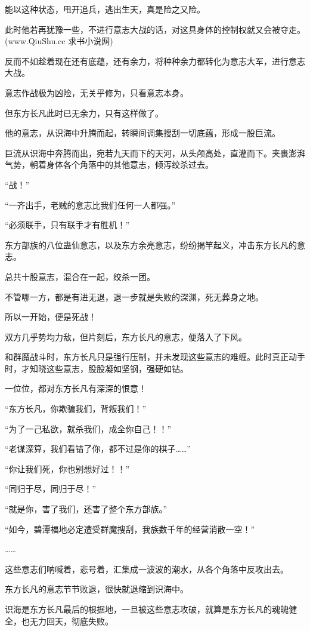 \begin{this_body}
能以这种状态，甩开追兵，逃出生天，真是险之又险。

此时他若再犹豫一些，不进行意志大战的话，对这具身体的控制权就又会被夺走。(www.QiuShu.cc 求书小说网)

反而不如趁着现在还有底蕴，还有余力，将种种余力都转化为意志大军，进行意志大战。

意志作战极为凶险，无关乎修为，只看意志本身。

但东方长凡此时已无余力，只有这样做了。

他的意志，从识海中升腾而起，转瞬间调集搜刮一切底蕴，形成一股巨流。

巨流从识海中奔腾而出，宛若九天而下的天河，从头颅高处，直灌而下。夹裹澎湃气势，朝着身体各个角落中的其他意志，倾泻绞杀过去。

“战！”

“一齐出手，老贼的意志比我们任何一人都强。”

“必须联手，只有联手才有胜机！”

东方部族的八位蛊仙意志，以及东方余亮意志，纷纷揭竿起义，冲击东方长凡的意志。

总共十股意志，混合在一起，绞杀一团。

不管哪一方，都是有进无退，退一步就是失败的深渊，死无葬身之地。

所以一开始，便是死战！

双方几乎势均力敌，但片刻后，东方长凡的意志，便落入了下风。

和群魔战斗时，东方长凡只是强行压制，并未发现这些意志的难缠。此时真正动手时，才知晓这些意志，股股凝如坚钢，强硬如钻。

一位位，都对东方长凡有深深的恨意！

“东方长凡，你欺骗我们，背叛我们！”

“为了一己私欲，就杀我们，成全你自己！！”

“老谋深算，我们看错了你，都不过是你的棋子……”

“你让我们死，你也别想好过！！”

“同归于尽，同归于尽！”

“就是你，害了我们，还害了整个东方部族。”

“如今，碧潭福地必定遭受群魔搜刮，我族数千年的经营消散一空！”

……

这些意志们呐喊着，悲号着，汇集成一波波的潮水，从各个角落中反攻出去。

东方长凡的意志节节败退，很快就退缩到识海中。

识海是东方长凡最后的根据地，一旦被这些意志攻破，就算是东方长凡的魂魄健全，也无力回天，彻底失败。


\end{this_body}
